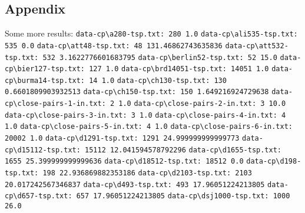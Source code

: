 \documentclass{tufte-handout}
\begin{document}
\newpage
\subsection{Appendix}
Some more results:\newline
\verb+data-cp\a280-tsp.txt: 280 1.0+ \newline
\verb+data-cp\ali535-tsp.txt: 535 0.0+ \newline
\verb+data-cp\att48-tsp.txt: 48 131.46862743635836+ \newline
\verb+data-cp\att532-tsp.txt: 532 3.1622776601683795+ \newline
\verb+data-cp\berlin52-tsp.txt: 52 15.0+ \newline
\verb+data-cp\bier127-tsp.txt: 127 1.0+\newline
\verb+data-cp\brd14051-tsp.txt: 14051 1.0+\newline
\verb+data-cp\burma14-tsp.txt: 14 1.0+\newline
\verb+data-cp\ch130-tsp.txt: 130 0.6601809903932513+\newline
\verb+data-cp\ch150-tsp.txt: 150 1.649216924729638+\newline
\verb+data-cp\close-pairs-1-in.txt: 2 1.0+\newline
\verb+data-cp\close-pairs-2-in.txt: 3 10.0+\newline
\verb+data-cp\close-pairs-3-in.txt: 3 1.0+\newline
\verb+data-cp\close-pairs-4-in.txt: 4 1.0+\newline
\verb+data-cp\close-pairs-5-in.txt: 4 1.0+\newline
\verb+data-cp\close-pairs-6-in.txt: 20002 1.0+\newline
\verb+data-cp\d1291-tsp.txt: 1291 24.999999999999773+\newline
\verb+data-cp\d15112-tsp.txt: 15112 12.041594578792296+\newline
\verb+data-cp\d1655-tsp.txt: 1655 25.399999999999636+\newline
\verb+data-cp\d18512-tsp.txt: 18512 0.0+\newline
\verb+data-cp\d198-tsp.txt: 198 22.936869882353186+\newline
\verb+data-cp\d2103-tsp.txt: 2103 20.017242567346837+\newline
\verb+data-cp\d493-tsp.txt: 493 17.96051224213805+\newline
\verb+data-cp\d657-tsp.txt: 657 17.96051224213805+\newline
\verb+data-cp\dsj1000-tsp.txt: 1000 26.0+\newline
\end{document}
